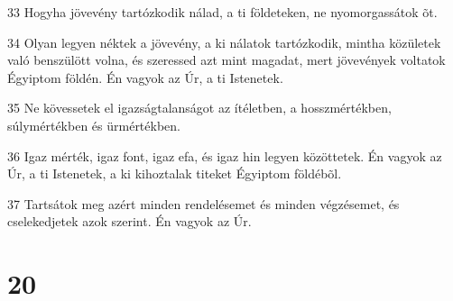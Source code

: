 \par 33 Hogyha jövevény tartózkodik nálad, a ti földeteken, ne nyomorgassátok õt.
\par 34 Olyan legyen néktek a jövevény, a ki nálatok tartózkodik, mintha közületek való benszülött volna, és szeressed azt mint magadat, mert jövevények voltatok Égyiptom földén. Én vagyok az Úr, a ti Istenetek.
\par 35 Ne kövessetek el igazságtalanságot az ítéletben, a hosszmértékben, súlymértékben és ürmértékben.
\par 36 Igaz mérték, igaz font, igaz efa, és igaz hin legyen közöttetek. Én vagyok az Úr, a ti Istenetek, a ki kihoztalak titeket Égyiptom földébõl.
\par 37 Tartsátok meg azért minden rendelésemet és minden végzésemet, és cselekedjetek azok szerint. Én vagyok az Úr.

\chapter{20}

